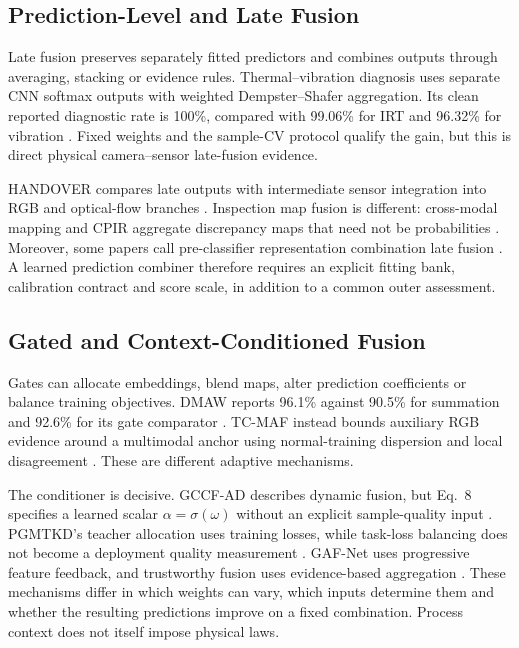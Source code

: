 \subsection{Prediction-Level and Late Fusion}
Late fusion preserves separately fitted predictors and combines outputs through averaging, stacking or evidence rules. Thermal--vibration diagnosis uses separate CNN softmax outputs with weighted Dempster--Shafer aggregation. Its clean reported diagnostic rate is 100\%, compared with 99.06\% for IRT and 96.32\% for vibration \citep[PDF p.~7, Table~VII]{Huo2022Multisensor}. Fixed weights and the sample-CV protocol qualify the gain, but this is direct physical camera--sensor late-fusion evidence.

HANDOVER compares late outputs with intermediate sensor integration into RGB and optical-flow branches \citep[PDF pp.~5--7]{Thoduka2024Handover}. Inspection map fusion is different: cross-modal mapping and CPIR aggregate discrepancy maps that need not be probabilities \citep{Costanzino2024Multimodal,Shangguan2025CPIR}. Moreover, some papers call pre-classifier representation combination late fusion \citep{Wang2020What,Xie2025Audiovisual}. A learned prediction combiner therefore requires an explicit fitting bank, calibration contract and score scale, in addition to a common outer assessment.

\subsection{Gated and Context-Conditioned Fusion}
Gates can allocate embeddings, blend maps, alter prediction coefficients or balance training objectives. DMAW reports 96.1\% against 90.5\% for summation and 92.6\% for its gate comparator \citep[PDF p.~9, Table~V]{P003}. TC-MAF instead bounds auxiliary RGB evidence around a multimodal anchor using normal-training dispersion and local disagreement \citep[PDF pp.~3--5]{P026}. These are different adaptive mechanisms.

The conditioner is decisive. GCCF-AD describes dynamic fusion, but Eq.~8 specifies a learned scalar $\alpha=\sigma(\omega)$ without an explicit sample-quality input \citep[PDF p.~3]{P038}. PGMTKD's teacher allocation uses training losses, while task-loss balancing does not become a deployment quality measurement \citep{Li2025PGMTKD,P045}. GAF-Net uses progressive feature feedback, and trustworthy fusion uses evidence-based aggregation \citep{Huang2026Rolling,Ying2025Trustworthy}. These mechanisms differ in which weights can vary, which inputs determine them and whether the resulting predictions improve on a fixed combination. Process context does not itself impose physical laws.

